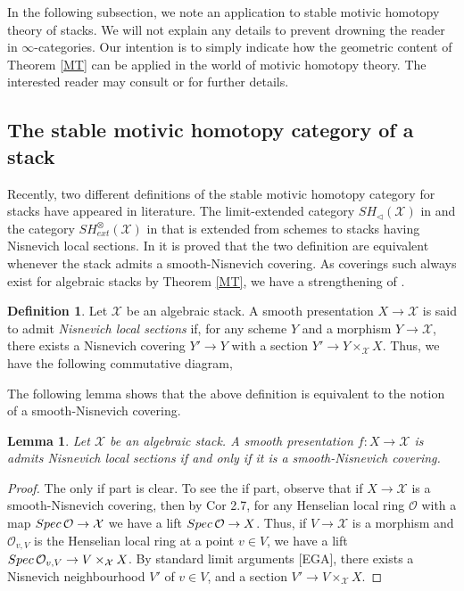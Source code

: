 \documentclass[10pt]{amsart}
\theoremstyle{plain}
\newtheorem{lemma}[thm]{Lemma}
\theoremstyle{definition}
\newtheorem{definition}[thm]{Definition}
\newcommand{\Spec}{{\rm Spec \,}}
\newcommand{\sO}{{\mathcal O}}
\newcommand{\sX}{{\mathcal X}}
\begin{document}
\noindent In the following subsection, we note an application to stable motivic homotopy theory of stacks. We will not explain any details to prevent drowning the reader in $\infty$-categories. Our intention is to simply indicate how the geometric content of Theorem \ref{MT} can be applied in the world of motivic homotopy theory. The interested reader may consult \cite{chow21} or \cite{khan2021generalized} for further details.
\subsection{The stable motivic homotopy category of a stack}
Recently, two different definitions of the stable motivic homotopy category for stacks have appeared in literature. The limit-extended category $SH_\lhd(\sX)$ in \cite{khan2021generalized} and the category $SH_{ext}^{\otimes}(\sX)$ in \cite{chow21} that is extended from schemes to stacks having Nisnevich local sections. In \cite{chow21} it is proved that the two definition are equivalent
whenever the stack admits a smooth-Nisnevich covering. As coverings such always exist for algebraic stacks by Theorem \ref{MT}, we have a strengthening of \cite[Corollary 2.5.4]{chow21}.

\begin{definition}
	Let $\sX$ be an algebraic stack. A smooth presentation $X\rightarrow\sX$ is said to admit \textit{Nisnevich local sections} if, for any scheme $Y$ and a morphism $Y\rightarrow\sX$, there exists a Nisnevich covering $Y'\rightarrow Y$ with a section $Y'\rightarrow Y\times_\sX X$. Thus, we have the following commutative diagram,
	\begin{center}
	\end{center}
\end{definition}

The following lemma shows that the above definition is equivalent to the notion of a smooth-Nisnevich covering.

\begin{lemma}
	Let $\sX$ be an algebraic stack. A smooth presentation $f: X\rightarrow \sX$ is admits Nisnevich local sections if and only if it is a smooth-Nisnevich covering.
\end{lemma}
\begin{proof}
	The only if part is clear. To see the if part, observe that if $X\rightarrow\sX$ is a smooth-Nisnevich covering, then by Cor 2.7, for any Henselian local ring $\sO$ with a map $\Spec \sO\rightarrow \sX$ we have a lift $\Spec\sO \rightarrow X$. Thus, if $V\rightarrow\sX$ is a morphism and $\sO_{v,V}$ is the Henselian local ring at a point $v\in V$, we have a lift $\Spec\sO_{v,V}\rightarrow V\times_\sX X$. By standard limit arguments [EGA], there exists a Nisnevich neighbourhood $V'$ of $v\in V$, and a section $V'\rightarrow V\times_\sX X$.
\end{proof}
\end{document}
